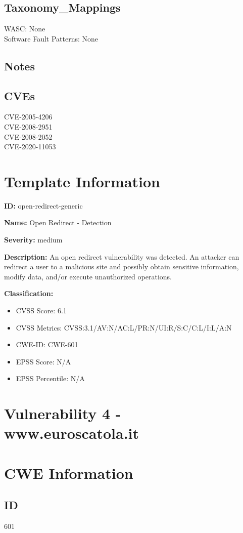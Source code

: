 \subsection*{Taxonomy\_Mappings}
WASC: None\\
Software Fault Patterns: None\\
\subsection*{Notes}
\subsection*{CVEs}
CVE-2005-4206\\
CVE-2008-2951\\
CVE-2008-2052\\
CVE-2020-11053\\
\section*{Template Information}
\textbf{ID:} open-redirect-generic

\textbf{Name:} Open Redirect - Detection

\textbf{Severity:} medium

\textbf{Description:} An open redirect vulnerability was detected. An attacker can redirect a user to a malicious site and possibly obtain sensitive information, modify data, and/or execute unauthorized operations.

\textbf{Classification:}
\begin{itemize}
\item CVSS Score: 6.1
\item CVSS Metrics: CVSS:3.1/AV:N/AC:L/PR:N/UI:R/S:C/C:L/I:L/A:N
\item CWE-ID: CWE-601
\item EPSS Score: N/A
\item EPSS Percentile: N/A
\end{itemize}



\section*{Vulnerability 4 - www.euroscatola.it}

\section*{CWE Information}
\subsection*{ID}
601

